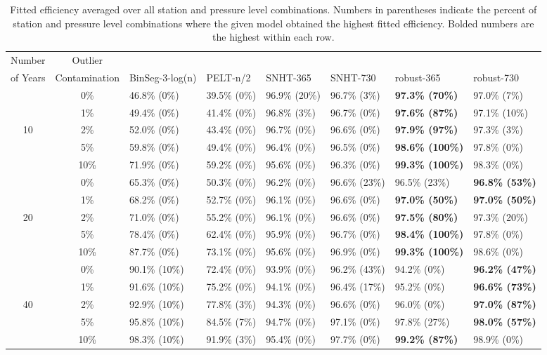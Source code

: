 \documentclass[12pt]{article}
\begin{document}
\begin{landscape}
\begin{table}[ht]
\centering
\begin{tabular}{cc|llllll}
  \hline
Number & Outlier & & & & & &\\ 
of Years & Contamination & BinSeg-3-log(n) & PELT-n/2 & SNHT-365 & SNHT-730 & robust-365 & robust-730 \\ 
  \hline
 & 0\% &  46.8\% (0\%) & 39.5\% (0\%) & 96.9\% (20\%) & 96.7\% (3\%) & \textbf{97.3\% (70\%)} & 97.0\% (7\%) \\ 
   & 1\% &  49.4\% (0\%) & 41.4\% (0\%) & 96.8\% (3\%) & 96.7\% (0\%) & \textbf{97.6\% (87\%)} & 97.1\% (10\%) \\ 
  10 & 2\% &  52.0\% (0\%) & 43.4\% (0\%) & 96.7\% (0\%) & 96.6\% (0\%) & \textbf{97.9\% (97\%)} & 97.3\% (3\%) \\ 
   & 5\% &  59.8\% (0\%) & 49.4\% (0\%) & 96.4\% (0\%) & 96.5\% (0\%) & \textbf{98.6\% (100\%)} & 97.8\% (0\%) \\ 
   & 10\% &  71.9\% (0\%) & 59.2\% (0\%) & 95.6\% (0\%) & 96.3\% (0\%) & \textbf{99.3\% (100\%)} & 98.3\% (0\%) \\ 
  \hline
   & 0\% &  65.3\% (0\%) & 50.3\% (0\%) & 96.2\% (0\%) & 96.6\% (23\%) & 96.5\% (23\%) & \textbf{96.8\% (53\%)} \\ 
   & 1\% &  68.2\% (0\%) & 52.7\% (0\%) & 96.1\% (0\%) & 96.6\% (0\%) & \textbf{97.0\% (50\%)} & \textbf{97.0\% (50\%)} \\ 
  20 & 2\% &  71.0\% (0\%) & 55.2\% (0\%) & 96.1\% (0\%) & 96.6\% (0\%) & \textbf{97.5\% (80\%)} & 97.3\% (20\%) \\ 
   & 5\% &  78.4\% (0\%) & 62.4\% (0\%) & 95.9\% (0\%) & 96.7\% (0\%) & \textbf{98.4\% (100\%)} & 97.8\% (0\%) \\ 
   & 10\% &  87.7\% (0\%) & 73.1\% (0\%) & 95.6\% (0\%) & 96.9\% (0\%) & \textbf{99.3\% (100\%)} & 98.6\% (0\%) \\ 
  \hline
   & 0\% &  90.1\% (10\%) & 72.4\% (0\%) & 93.9\% (0\%) & 96.2\% (43\%) & 94.2\% (0\%) & \textbf{96.2\% (47\%)} \\ 
   & 1\% &  91.6\% (10\%) & 75.2\% (0\%) & 94.1\% (0\%) & 96.4\% (17\%) & 95.2\% (0\%) & \textbf{96.6\% (73\%)} \\ 
  40 & 2\% &  92.9\% (10\%) & 77.8\% (3\%) & 94.3\% (0\%) & 96.6\% (0\%) & 96.0\% (0\%) & \textbf{97.0\% (87\%)} \\ 
   & 5\% &  95.8\% (10\%) & 84.5\% (7\%) & 94.7\% (0\%) & 97.1\% (0\%) & 97.8\% (27\%) & \textbf{98.0\% (57\%)} \\ 
   & 10\% &  98.3\% (10\%) & 91.9\% (3\%) & 95.4\% (0\%) & 97.7\% (0\%) & \textbf{99.2\% (87\%)} & 98.9\% (0\%) \\ 
\hline
\end{tabular}
\caption{Fitted efficiency averaged over all station and pressure level combinations.  Numbers in parentheses indicate the percent of station and pressure level combinations where the given model obtained the highest fitted efficiency. Bolded numbers are the highest within each row.}
\label{tab:homOrd}
\end{table}
\end{landscape}
\end{document}
